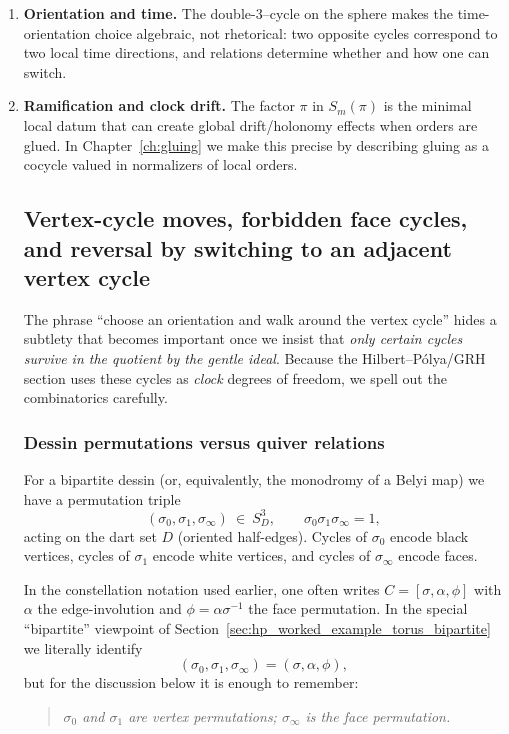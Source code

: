 \documentclass[11pt,oneside]{amsbook}
\numberwithin{equation}{section}
\theoremstyle{plain}
\theoremstyle{definition}
\theoremstyle{remark}
\begin{document}
\begin{enumerate}
\item \textbf{Orientation and time.}  The double-$3$--cycle on the sphere makes the time-orientation choice algebraic, not rhetorical: two opposite cycles correspond to two local time directions, and relations determine whether and how one can switch.
\item \textbf{Ramification and clock drift.}  The factor $\pi$ in $S_m(\pi)$ is the minimal local datum that can create global drift/holonomy effects when orders are glued.  In Chapter~\ref{ch:gluing} we make this precise by describing gluing as a cocycle valued in normalizers of local orders.


\subsection{Vertex-cycle moves, forbidden face cycles, and reversal by switching to an adjacent vertex cycle}
\label{sec:vertex_cycle_reversal_switching}

The phrase ``choose an orientation and walk around the vertex cycle'' hides a subtlety that becomes important once we insist that
\emph{only certain cycles survive in the quotient by the gentle ideal}.
Because the Hilbert--Pólya/GRH section uses these cycles as \emph{clock} degrees of freedom, we spell out the combinatorics carefully.

\subsubsection{Dessin permutations versus quiver relations}

For a bipartite dessin (or, equivalently, the monodromy of a Belyi map) we have a permutation triple
\[
(\sigma_0,\sigma_1,\sigma_\infty)\ \in\ S_D^3,\qquad \sigma_0\sigma_1\sigma_\infty=1,
\]
acting on the dart set $D$ (oriented half-edges).
Cycles of $\sigma_0$ encode black vertices, cycles of $\sigma_1$ encode white vertices, and cycles of $\sigma_\infty$ encode faces.

In the constellation notation used earlier, one often writes $C=[\sigma,\alpha,\phi]$ with $\alpha$ the edge-involution and
$\phi=\alpha\sigma^{-1}$ the face permutation.
In the special ``bipartite'' viewpoint of Section~\ref{sec:hp_worked_example_torus_bipartite} we literally identify
\[
(\sigma_0,\sigma_1,\sigma_\infty)=(\sigma,\alpha,\phi),
\]
but for the discussion below it is enough to remember:

\begin{quote}
\emph{$\sigma_0$ and $\sigma_1$ are vertex permutations; $\sigma_\infty$ is the face permutation.}
\end{quote}


\end{enumerate}
\end{document}
